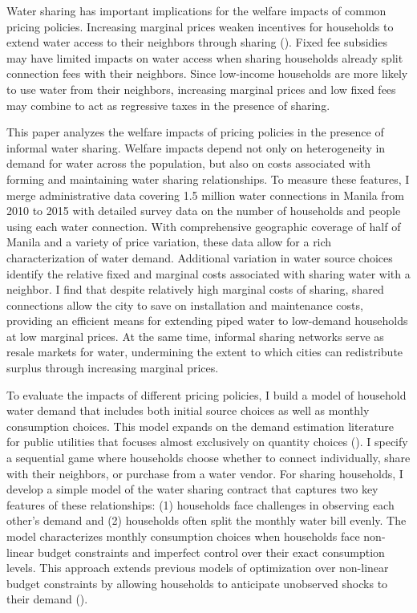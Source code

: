 \documentclass[12pt]{article}
\begin{document}
Water sharing has important implications for the welfare impacts of common pricing policies.  Increasing marginal prices weaken incentives for households to extend water access to their neighbors through sharing (\cite{whittington1992possible}).  Fixed fee subsidies may have limited impacts on water access when sharing households already split connection fees with their neighbors.  Since low-income households are more likely to use water from their neighbors, increasing marginal prices and low fixed fees may combine to act as regressive taxes in the presence of sharing.  

This paper analyzes the welfare impacts of pricing policies in the presence of informal water sharing.  Welfare impacts depend not only on heterogeneity in demand for water across the population, but also on costs associated with forming and maintaining water sharing relationships.  To measure these features, I merge administrative data covering 1.5 million water connections in Manila from 2010 to 2015 with detailed survey data on the number of households and people using each water connection.  With comprehensive geographic coverage of half of Manila and a variety of price variation, these data allow for a rich characterization of water demand.  Additional variation in water source choices identify the relative fixed and marginal costs associated with sharing water with a neighbor.  I find that despite relatively high marginal costs of sharing, shared connections allow the city to save on installation and maintenance costs, providing an efficient means for extending piped water to low-demand households at low marginal prices.  At the same time, informal sharing networks serve as resale markets for water, undermining the extent to which cities can redistribute surplus through increasing marginal prices.

To evaluate the impacts of different pricing policies, I build a model of household water demand that includes both initial source choices as well as monthly consumption choices.  This model expands on the demand estimation literature for public utilities that focuses almost exclusively on quantity choices (\cite{diakite2009proposal,mcrae2014infrastructure,olmstead2009reduced,szabo2015value}).  I specify a sequential game where households choose whether to connect individually, share with their neighbors, or purchase from a water vendor.  For sharing households, I develop a simple model of the water sharing contract that captures two key features of these relationships: (1) households face challenges in observing each other's demand and (2) households often split the monthly water bill evenly.  The model characterizes monthly consumption choices when households face non-linear budget constraints and imperfect control over their exact consumption levels.  This approach extends previous models of optimization over non-linear budget constraints by allowing households to anticipate unobserved shocks to their demand (\cite{moffitt1986econometrics,burtless1978effect}).
\end{document}
